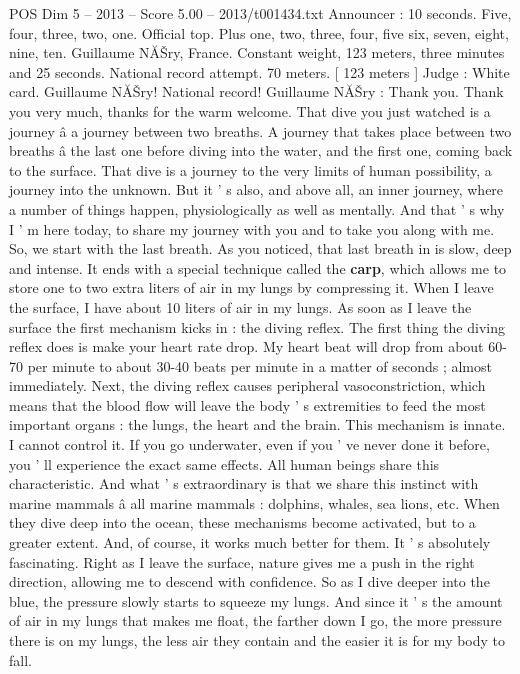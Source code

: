 \begin{textsample}{POS Dim 5 – 2013 – Score 5.00 – 2013/t001434.txt}  \label{ex:f5_pos_041}
Announcer : 10 seconds.
Five, four, three, two, one.
Official top.
Plus one, two, three, four, five six, seven, eight, nine, ten.
Guillaume NĂŠry, France.
Constant weight, 123 meters, three minutes and 25 seconds.
National record attempt. 70 meters. [ 123 meters ] Judge : White card.
Guillaume NĂŠry!
National record!
Guillaume NĂŠry : Thank you.
Thank you very much, thanks for the warm welcome.
That dive you just watched is a journey â a journey between two breaths.
A journey that takes place between two breaths â the last one before diving into the water, and the first one, coming back to the surface.
That dive is a journey to the very limits of human possibility, a journey into the unknown.
But it ' s also, and above all, an inner journey, where a number of things happen, physiologically as well as mentally.
And that ' s why I ' m here today, to share my journey with you and to take you along with me.
So, we start with the last breath.
As you noticed, that last breath in is slow, deep and intense.
It ends with a special technique called the \textbf{carp}, which allows me to store one to two extra liters of air in my lungs by compressing it.
When I leave the surface, I have about 10 liters of air in my lungs.
As soon as I leave the surface the first mechanism kicks in : the diving reflex.
The first thing the diving reflex does is make your heart rate drop.
My heart beat will drop from about 60-70 per minute to about 30-40 beats per minute in a matter of seconds ; almost immediately.
Next, the diving reflex causes peripheral vasoconstriction, which means that the blood flow will leave the body ' s extremities to feed the most important organs : the lungs, the heart and the brain.
This mechanism is innate.
I cannot control it.
If you go underwater, even if you ' ve never done it before, you ' ll experience the exact same effects.
All human beings share this characteristic.
And what ' s extraordinary is that we share this instinct with marine mammals â all marine mammals : dolphins, whales, sea lions, etc.
When they dive deep into the ocean, these mechanisms become activated, but to a greater extent.
And, of course, it works much better for them.
It ' s absolutely fascinating.
Right as I leave the surface, nature gives me a push in the right direction, allowing me to descend with confidence.
So as I dive deeper into the blue, the pressure slowly starts to squeeze my lungs.
And since it ' s the amount of air in my lungs that makes me float, the farther down I go, the more pressure there is on my lungs, the less air they contain and the easier it is for my body to fall.

\end{textsample}
